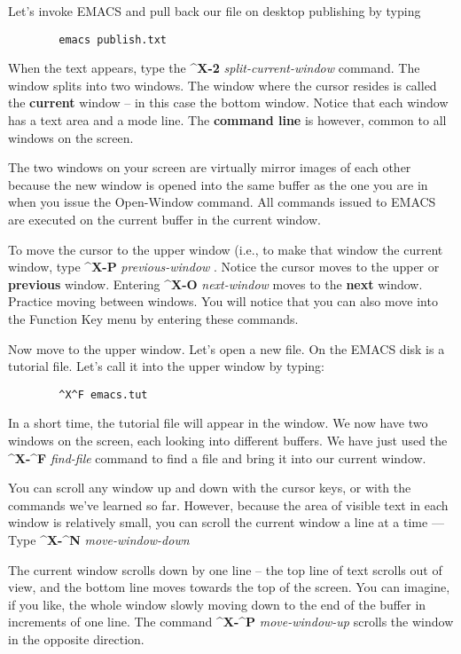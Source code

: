 Let's invoke EMACS and pull back our file on desktop publishing by
typing

\begin{verbatim}
        emacs publish.txt
\end{verbatim}

When the text appears, type the {\bf{}\^{}X-2} {\it{}split-current-window}
 command.  The window splits into two
windows.  The window where the cursor resides is called the {\bf{}current}
window -- in this case the bottom window.  Notice that each window has a
text area and a mode line.  The {\bf{}command line} is however, common to
all windows on the screen.

The two windows on your screen are virtually mirror images of each other
because the new window is opened into the same buffer as the one you are
in when you issue the Open-Window command.  All commands issued to EMACS
are executed on the current buffer in the current window.

To move the cursor to the upper window (i.e., to make that window the
current window, type {\bf{}\^{}X-P} {\it{}previous-window}
.  Notice the cursor moves to the upper or
{\bf{}previous} window.  Entering {\bf{}\^{}X-O} {\it{}next-window}
moves to the {\bf{}next} window.  Practice moving between windows.
You will notice that you can also move into the Function Key menu by
entering these commands.

Now move to the upper window.  Let's open a new file.  On the EMACS disk
is a tutorial file.  Let's call it into the upper window by typing:

\begin{verbatim}
        ^X^F emacs.tut
\end{verbatim}

In a short time, the tutorial file will appear in the window.  We now
have two windows on the screen, each looking into different buffers.
We have just used the {\bf{}\^{}X-\^{}F} {\it{}find-file}
 command to find a file and bring it into our current
window.

You can scroll any window up and down with the cursor keys, or with
the commands we've learned so far.  However, because the area of
visible text in each window is relatively small, you can scroll the
current window a line at a time --- Type {\bf{}\^{}X-\^{}N}
{\it{}move-window-down} 

The current window scrolls down by one line -- the top line of text
scrolls out of view, and the bottom line moves towards the top of the
screen.  You can imagine, if you like, the whole window slowly moving
down to the end of the buffer in increments of one line.  The command
{\bf{}\^{}X-\^{}P} {\it{}move-window-up} 
scrolls the window in the opposite direction.

